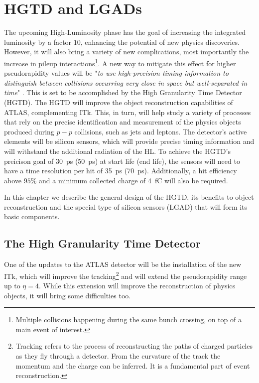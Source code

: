 \chapter{HGTD and LGADs}\label{chap:HGTD_LGADs}

The upcoming High-Luminosity phase has the goal of increasing the integrated luminosity by a factor $10$, enhancing the potential of new physics discoveries. However, it will also bring a variety of new complications, most importantly the increase in pileup interactions\footnote{Multiple collisions happening during the same bunch crossing, on top of a main event of interest.}.
A new way to mitigate this effect for higher pseudorapidity values will be "\textit{to use high-precision timing information to distinguish between collisions occurring very close in space but well-separated in time}" \cite{CERN-LHCC-2020-007}. This is set to be accomplished by the High Granularity Time Detector (HGTD).
The HGTD will improve the object reconstruction capabilities of ATLAS, complementing ITk. This, in turn, will help study a variety of processes that rely on the precise identification and measurement of the physics objects produced during $p-p$ collisions, such as jets and leptons.
The detector's active elements will be silicon sensors, which will provide precise timing information and will withstand the additional radiation of the HL. To achieve the HGTD's preicison goal of \qty{30}{\pico\second} (\qty{50}{\pico\second}) at start life (end life), the sensors will need to have a time resolution per hit of \qty{35}{\pico\second} (\qty{70}{\pico\second}). Additionally, a hit efficiency above $95\%$ and %
a minimum collected charge of \qty{4}{\femto\coulomb} will also be required.

In this chapter we describe the general design of the HGTD, its benefits to object reconstruction and the special type of silicon sensors (LGAD) that will form its basic components.

\section{The High Granularity Time Detector}\label{sec:HGTD}
One of the updates to the ATLAS detector will be the installation of the new ITk, which will improve the tracking\footnote{Tracking refers to the process of reconstructing the paths of charged particles as they fly through a detector. From the curvature of the track the momentum and the charge can be inferred. It is a fundamental part of event reconstruction.} and will extend the pseudorapidity range up to $\eta=4$. While this extension will improve the reconstruction of physics objects, it will bring some difficulties too.

